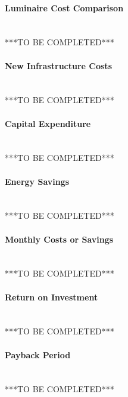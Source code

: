 \paragraph{Luminaire Cost Comparison}
~\\
***TO BE COMPLETED***

\paragraph{New Infrastructure Costs}
~\\
***TO BE COMPLETED***

\paragraph{Capital Expenditure}
~\\
***TO BE COMPLETED***

\paragraph{Energy Savings}
~\\
***TO BE COMPLETED***

\paragraph{Monthly Costs or Savings}
~\\
***TO BE COMPLETED***

\paragraph{Return on Investment}
~\\
***TO BE COMPLETED***

\paragraph{Payback Period}
~\\
***TO BE COMPLETED***

